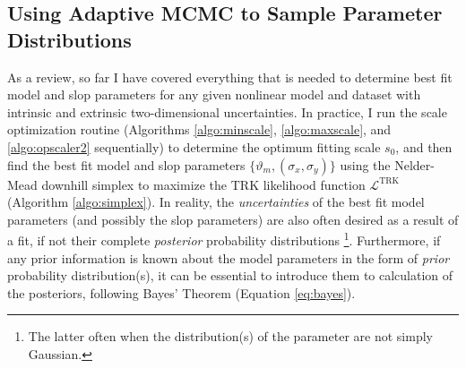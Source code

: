 \subsection{Using Adaptive MCMC to Sample Parameter Distributions}
\label{sec:MCMC}
As a review, so far I have covered everything that is needed to determine best fit model and slop parameters for any given nonlinear model and dataset with intrinsic and extrinsic two-dimensional uncertainties. In practice, I run the scale optimization routine (Algorithms \ref{algo:minscale}, \ref{algo:maxscale}, and \ref{algo:opscaler2} sequentially) to determine the optimum fitting scale $s_0$, and then find the best fit model and slop parameters $\{\vartheta_m,(\sigma_x,\sigma_y)\}$ using the Nelder-Mead downhill simplex to maximize the TRK likelihood function $\mathcal{L}^\text{TRK}$ (Algorithm \ref{algo:simplex}). In reality, the \textit{uncertainties} of the best fit model parameters (and possibly the slop parameters) are also often desired as a result of a fit, if not their complete \textit{posterior} probability distributions \footnote{The latter often when the distribution(s) of the parameter are not simply Gaussian.}. Furthermore, if any prior information is known about the model parameters in the form of \textit{prior} probability distribution(s), it can be essential to introduce them to calculation of the posteriors, following Bayes' Theorem (Equation \eqref{eq:bayes}).

